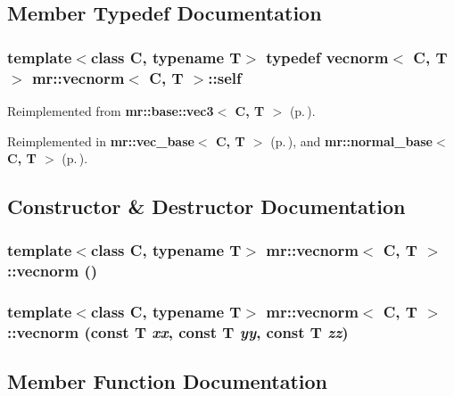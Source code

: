 \subsection{Member Typedef Documentation}
\subsubsection{\setlength{\rightskip}{0pt plus 5cm}template$<$class C, typename T$>$ typedef {\bf vecnorm}$<$ C, T $>$ {\bf mr::vecnorm}$<$ C, T $>$::{\bf self}}\label{structmr_1_1vecnorm_w0}




Reimplemented from {\bf mr::base::vec3$<$ C, T $>$} {\rm (p.\,\pageref{structmr_1_1base_1_1vec3_w0})}.

Reimplemented in {\bf mr::vec\_\-base$<$ C, T $>$} {\rm (p.\,\pageref{structmr_1_1vec__base_w0})}, and {\bf mr::normal\_\-base$<$ C, T $>$} {\rm (p.\,\pageref{structmr_1_1normal__base_w0})}.

\subsection{Constructor \& Destructor Documentation}
\subsubsection{\setlength{\rightskip}{0pt plus 5cm}template$<$class C, typename T$>$ {\bf mr::vecnorm}$<$ C, T $>$::{\bf vecnorm} ()\hspace{0.3cm}{\tt  [inline]}}\label{structmr_1_1vecnorm_a0}


\subsubsection{\setlength{\rightskip}{0pt plus 5cm}template$<$class C, typename T$>$ {\bf mr::vecnorm}$<$ C, T $>$::{\bf vecnorm} (const T {\em xx}, const T {\em yy}, const T {\em zz})\hspace{0.3cm}{\tt  [inline]}}\label{structmr_1_1vecnorm_a1}




\subsection{Member Function Documentation}
